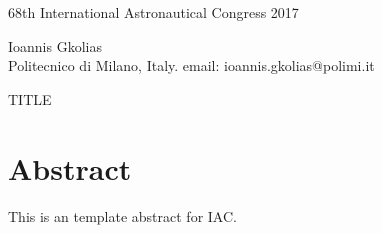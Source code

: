 \documentclass[10pt]{article}
\begin{document}
\begin{center}
68th International Astronautical Congress 2017
\vspace{30pt}

Ioannis Gkolias \\
Politecnico di Milano, Italy. email: ioannis.gkolias@polimi.it

\bigskip

TITLE
\vspace{12pt}
\end{center}

\section*{Abstract} %
\vspace{-4pt}

This is an template abstract for IAC.
\end{document}
